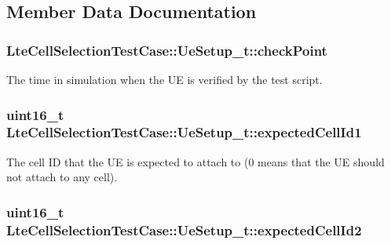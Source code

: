 \subsection{Member Data Documentation}
\subsubsection[{\texorpdfstring{check\+Point}{checkPoint}}]{ Lte\+Cell\+Selection\+Test\+Case\+::\+Ue\+Setup\+\_\+t\+::check\+Point}\hypertarget{structLteCellSelectionTestCase_1_1UeSetup__t_aeb15c381f72d6800f421bead43ad16bb}{}\label{structLteCellSelectionTestCase_1_1UeSetup__t_aeb15c381f72d6800f421bead43ad16bb}


The time in simulation when the UE is verified by the test script. 

\subsubsection[{\texorpdfstring{expected\+Cell\+Id1}{expectedCellId1}}]{\setlength{\rightskip}{0pt plus 5cm}uint16\+\_\+t Lte\+Cell\+Selection\+Test\+Case\+::\+Ue\+Setup\+\_\+t\+::expected\+Cell\+Id1}\hypertarget{structLteCellSelectionTestCase_1_1UeSetup__t_a54e1f0460b1f6523099aec77d8888d4d}{}\label{structLteCellSelectionTestCase_1_1UeSetup__t_a54e1f0460b1f6523099aec77d8888d4d}


The cell ID that the UE is expected to attach to (0 means that the UE should not attach to any cell). 

\subsubsection[{\texorpdfstring{expected\+Cell\+Id2}{expectedCellId2}}]{\setlength{\rightskip}{0pt plus 5cm}uint16\+\_\+t Lte\+Cell\+Selection\+Test\+Case\+::\+Ue\+Setup\+\_\+t\+::expected\+Cell\+Id2}\hypertarget{structLteCellSelectionTestCase_1_1UeSetup__t_a44ed53e08ab981aefba7dc11ac9210a3}{}\label{structLteCellSelectionTestCase_1_1UeSetup__t_a44ed53e08ab981aefba7dc11ac9210a3}


